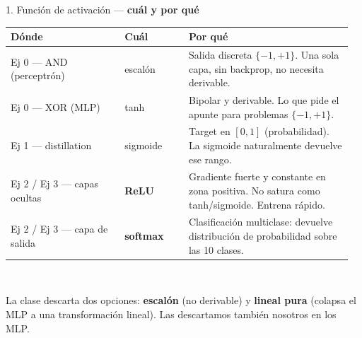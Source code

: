 \documentclass[11pt,aspectratio=169]{beamer}
\begin{document}
\begin{frame}{1. Función de activación — \textbf{cuál y por qué}}
\small
\begin{tabular}{@{}p{0.32\linewidth}p{0.18\linewidth}p{0.46\linewidth}@{}}
\toprule
\textbf{Dónde} & \textbf{Cuál} & \textbf{Por qué} \\
\midrule
Ej 0 — AND (perceptrón) & escalón & Salida discreta $\{-1,+1\}$. Una sola capa, sin backprop, no necesita derivable. \\
Ej 0 — XOR (MLP) & tanh & Bipolar y derivable. Lo que pide el apunte para problemas $\{-1,+1\}$. \\
Ej 1 — distillation & sigmoide & Target en $[0,1]$ (probabilidad). La sigmoide naturalmente devuelve ese rango. \\
\rowcolor{accent2!10}
Ej 2 / Ej 3 — capas ocultas & \textbf{ReLU} & Gradiente fuerte y constante en zona positiva. No satura como tanh/sigmoide. Entrena rápido. \\
\rowcolor{accent2!10}
Ej 2 / Ej 3 — capa de salida & \textbf{softmax} & Clasificación multiclase: devuelve distribución de probabilidad sobre las 10 clases. \\
\bottomrule
\end{tabular}\\[0.6em]

\begin{insight}
La clase descarta dos opciones: \textbf{escalón} (no derivable) y \textbf{lineal pura} (colapsa el MLP a una transformación lineal). Las descartamos también nosotros en los MLP.
\end{insight}
\end{frame}
\end{document}
